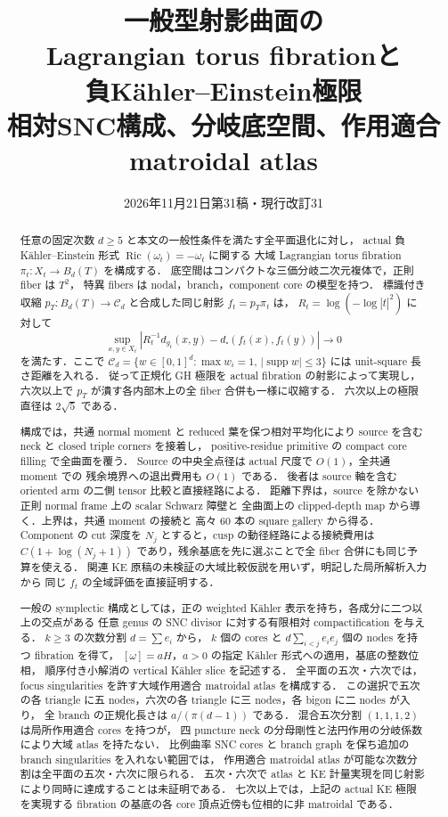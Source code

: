 \documentclass[11pt,a4paper]{article}
\title{一般型射影曲面の\\Lagrangian torus fibrationと\\負Kähler--Einstein極限\\[0.5em]\large 相対SNC構成、分岐底空間、作用適合matroidal atlas}
\author{}
\date{2026年11月21日\quad 第31稿・現行改訂31}
\begin{document}
\maketitle
\begin{abstract}
任意の固定次数 $d\ge5$ と本文の一般性条件を満たす全平面退化に対し，
actual 負 Kähler--Einstein 形式 $\operatorname{Ric}(\omega_t)=-\omega_t$ に関する
大域 Lagrangian torus fibration
$\pi_t:X_t\to B_d(T)$ を構成する．
底空間はコンパクトな三価分岐二次元複体で，正則 fiber は $T^2$，
特異 fibers は nodal，branch，component core の模型を持つ．
標識付き収縮 $p_T:B_d(T)\to\mathcal C_d$ と合成した同じ射影 $f_t=p_T\pi_t$ は，
$R_t=\log(-\log|t|^2)$ に対して
\[
 \sup_{x,y\in X_t}
 \left|R_t^{-1}d_{g_t}(x,y)-d_\square(f_t(x),f_t(y))\right|\longrightarrow0
\]
を満たす．ここで $\mathcal C_d=\{w\in[0,1]^d:\max w_i=1,\,
|\operatorname{supp}w|\le3\}$ には unit-square 長さ距離を入れる．
従って正規化 GH 極限を actual fibration の射影によって実現し，
六次以上で $p_T$ が潰す各内部木上の全 fiber 合併も一様に収縮する．
六次以上の極限直径は $2\sqrt5$ である．

構成では，共通 normal moment と reduced 葉を保つ相対平均化により
source を含む neck と closed triple corners を接着し，
positive-residue primitive の compact core filling で全曲面を覆う．
Source の中央全点径は actual 尺度で $O(1)$，全共通 moment での
残余境界への退出費用も $O(1)$ である．
後者は source 軸を含む oriented arm の二側 tensor 比較と直接経路による．
距離下界は，source を除かない正則 normal frame 上の scalar Schwarz 障壁と
全曲面上の clipped-depth map から導く．上界は，共通 moment の接続と
高々 $60$ 本の square gallery から得る．
Component の cut 深度を $N_j$ とすると，cusp の動径経路による接続費用は
$C(1+\log(N_j+1))$ であり，残余基底を先に選ぶことで全 fiber 合併にも同じ予算を使える．
関連 KE 原稿の未検証の大域比較仮説を用いず，明記した局所解析入力から
同じ $f_t$ の全域評価を直接証明する．

一般の symplectic 構成としては，正の weighted Kähler 表示を持ち，各成分に二つ以上の交点がある
任意 genus の SNC divisor に対する有限相対 compactification を与える．
$k\ge3$ の次数分割 $d=\sum e_i$ から，
$k$ 個の cores と $d\sum_{i<j}e_i e_j$ 個の nodes を持つ fibration を得て，
$[\omega]=aH$，$a>0$ の指定 Kähler 形式への適用，基底の整数位相，
順序付き小解消の vertical Kähler slice を記述する．
全平面の五次・六次では，focus singularities を許す大域作用適合 matroidal atlas を構成する．
この選択で五次の各 triangle に五 nodes，六次の各 triangle に三 nodes，各 bigon に二 nodes が入り，
全 branch の正規化長さは $a/(\pi(d-1))$ である．
混合五次分割 $(1,1,1,2)$ は局所作用適合 cores を持つが，
四 puncture neck の分母剛性と法円作用の分岐係数により大域 atlas を持たない．
比例曲率 SNC cores と branch graph を保ち追加の branch singularities を入れない範囲では，
作用適合 matroidal atlas が可能な次数分割は全平面の五次・六次に限られる．
五次・六次で atlas と KE 計量実現を同じ射影により同時に達成することは未証明である．
七次以上では，上記の actual KE 極限を実現する fibration の基底の各 core 頂点近傍も位相的に非 matroidal である．
\end{abstract}
\end{document}

